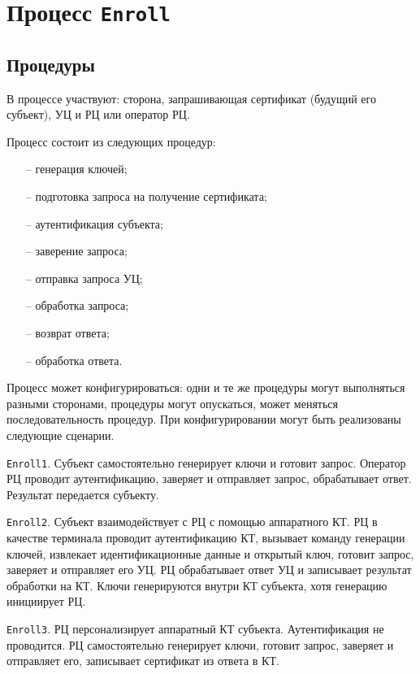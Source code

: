 \section{Процесс \texttt{Enroll}}\label{PROCESSES.Enroll}

\subsection{Процедуры}\label{PROCESSES.Enroll.List}

В процессе участвуют:  
сторона, запрашивающая сертификат (будущий его субъект),
УЦ и РЦ или оператор РЦ. 

Процесс состоит из следующих процедур:
\begin{itemize}
\item[--]
генерация ключей;
\item[--]
подготовка запроса на получение сертификата;
\item[--]
аутентификация субъекта;
\item[--]
заверение запроса;
\item[--]
отправка запроса УЦ;
\item[--]
обработка запроса;
\item[--]
возврат ответа;
\item[--]
обработка ответа.
\end{itemize}

Процесс может конфигурироваться: 
одни и те же процедуры могут выполняться разными сторонами,
процедуры могут опускаться, может меняться последовательность 
процедур. При конфигурировании могут быть реализованы следующие сценарии.

\texttt{Enroll1}. 
Субъект самостоятельно генерирует ключи и готовит запрос.
Оператор РЦ проводит аутентификацию, заверяет и отправляет запрос, 
обрабатывает ответ. Результат передается субъекту.

\texttt{Enroll2}. 
Субъект взаимодействует с РЦ с помощью аппаратного КТ. РЦ в качестве 
терминала проводит аутентификацию КТ, вызывает команду генерации ключей,
извлекает идентификационные данные и открытый ключ, готовит запрос, 
заверяет и отправляет его УЦ. РЦ обрабатывает ответ УЦ и записывает 
результат обработки на КТ. Ключи генерируются внутри КТ субъекта,
хотя генерацию инициирует РЦ.

\texttt{Enroll3}. 
РЦ персонализирует аппаратный КТ субъекта. 
Аутентификация не проводится. РЦ самостоятельно генерирует ключи,
готовит запрос, заверяет и отправляет его, записывает сертификат из ответа 
в КТ.

